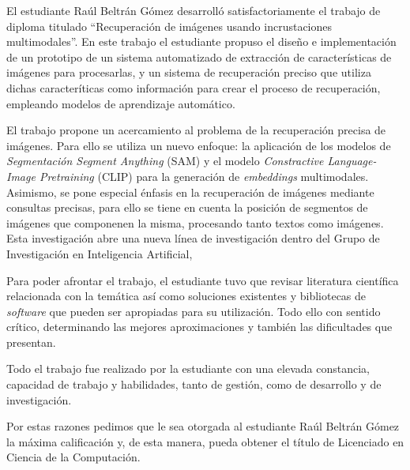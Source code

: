 \begin{opinion}
El estudiante Raúl Beltrán Gómez desarrolló satisfactoriamente el trabajo de diploma titulado “Recuperación de imágenes usando incrustaciones multimodales”. En este trabajo el estudiante propuso el diseño e implementación de un prototipo de un sistema automatizado de extracción de características de imágenes para procesarlas, y un sistema de recuperación preciso que utiliza dichas caracteríticas como información para crear el proceso de recuperación, empleando modelos de aprendizaje automático.

El trabajo propone un acercamiento al problema de la recuperación precisa de imágenes. Para
ello se utiliza un nuevo enfoque: la aplicación de los modelos de \textit{Segmentación Segment Anything} (SAM) y el modelo \textit{Constractive Language-Image Pretraining} (CLIP) para la generación de \textit{embeddings} multimodales. Asimismo, se pone especial énfasis en la recuperación de imágenes mediante consultas precisas, para ello se tiene en cuenta la posición de segmentos de imágenes que componenen la misma, procesando tanto textos como imágenes. Esta investigación abre una nueva línea de investigación dentro del Grupo de Investigación en Inteligencia Artificial,

Para poder afrontar el trabajo, el estudiante tuvo que revisar literatura científica relacionada con la temática así como soluciones existentes y bibliotecas de \textit{software} que pueden ser apropiadas para su utilización. Todo ello con sentido crítico, determinando las mejores aproximaciones y también las dificultades que presentan.

Todo el trabajo fue realizado por la estudiante con una elevada constancia, capacidad de trabajo y habilidades, tanto de gestión, como de desarrollo y de investigación. 

Por estas razones pedimos que le sea otorgada al estudiante Raúl Beltrán Gómez la máxima calificación y, de esta manera, pueda obtener el título de Licenciado en Ciencia de la Computación.
\end{opinion}